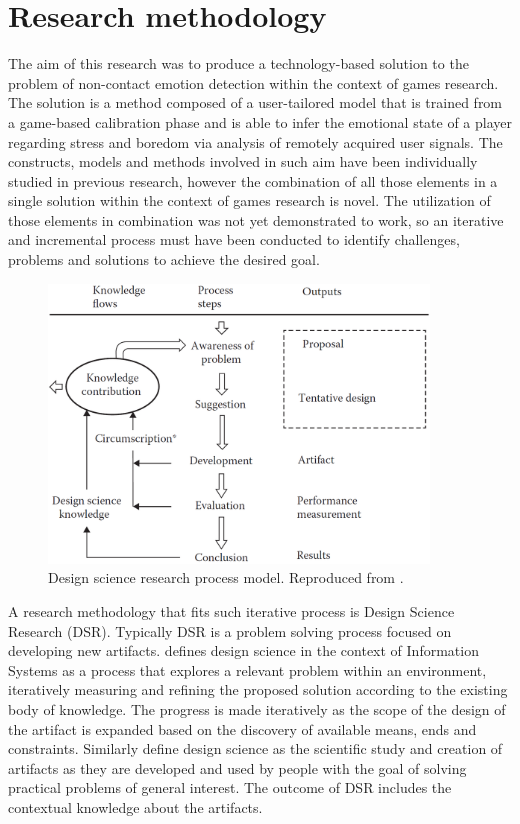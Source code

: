 \chapter{Research methodology}

The aim of this research was to produce a technology-based solution to the problem of non-contact emotion detection within the context of games research. The solution is a method composed of a user-tailored model that is trained from a game-based calibration phase and is able to infer the emotional state of a player regarding stress and boredom via analysis of remotely acquired user signals. The constructs, models and methods involved in such aim have been individually studied in previous research, however the combination of all those elements in a single solution within the context of games research is novel. The utilization of those elements in combination was not yet demonstrated to work, so an iterative and incremental process must have been conducted to identify challenges, problems and solutions to achieve the desired goal.

\begin{figure}[h]
    \centering
    \includegraphics[width=0.9\textwidth]{Content/figures/vaishnavi-design-science-process-model.png}
    \caption{Design science research process model. Reproduced from \textcite{vaishnavi2015design}.}
    \label{fig:vaishnavi-design-science-process-model}
\end{figure}

A research methodology that fits such iterative process is Design Science Research (DSR). Typically DSR is a problem solving process focused on developing new artifacts. \textcite{hevner2004design} defines design science in the context of Information Systems as a process that explores a relevant problem within an environment, iteratively measuring and refining the proposed solution according to the existing body of knowledge. The progress is made iteratively as the scope of the design of the artifact is expanded based on the discovery of available means, ends and constraints. Similarly \textcite{johannesson2014introduction} define design science as the scientific study and creation of artifacts as they are developed and used by people with the goal of solving practical problems of general interest. The outcome of DSR includes the contextual knowledge about the artifacts.

